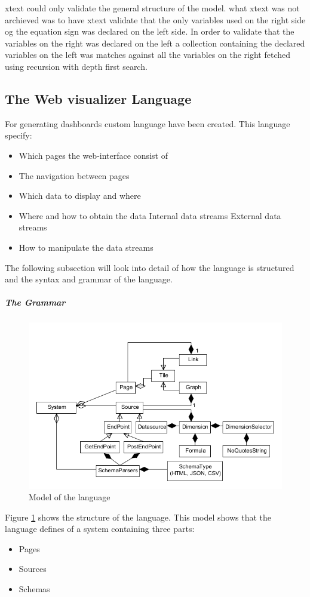 xtext could only validate the general structure of the model.
what xtext was not archieved was to have xtext validate that the only variables used
on the right side og the equation sign was declared on the left side.
In order to validate that the variables on the right was declared on the left a
collection containing the declared variables on the left was matches against all the variables
on the right fetched using recursion with depth first search.

\subsection{The Web visualizer Language}
For generating dashboards custom language have been created.
This language specify:
\begin{itemize}
\item Which pages the web-interface consist of
\item The navigation between pages
\item Which data to display and where
\item Where and how to obtain the data
\subitem Internal data streams
\subitem External data streams
\item How to manipulate the data streams
\end{itemize}
The following subsection will look into detail of how the language is structured and the syntax and grammar of the language.

\subparagraph{The Grammar}
\begin{figure}
\begin{center}
\includegraphics[width=\linewidth]{images/languagemodel}
\end{center}
\caption{Model of the language}
\label{fig:languagemodel}
\end{figure}
Figure \ref{fig:languagemodel} shows the structure of the language.
This model shows that the language defines of a system containing three parts:
\begin{itemize}
\item Pages
\item Sources
\item Schemas
\end{itemize}

